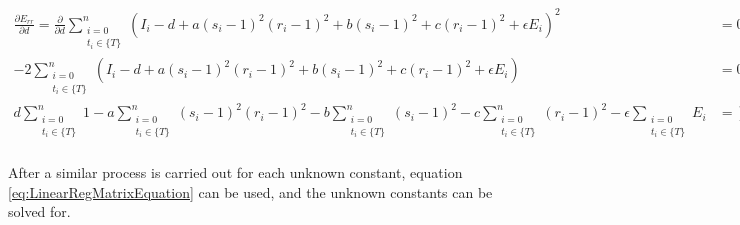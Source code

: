 \begin{equation*}
    \begin{split}
        \frac{\partial E_{rr}}{\partial d}=
        \frac{\partial}{\partial d}\sum_{
                \substack{i=0\\ t_i\in \{ T \}}
            }^n \left(
            I_i
            -d
            +a(s_i-1)^2(r_i-1)^2
            +b(s_i-1)^2
            +c(r_i-1)^2
            +\epsilon E_i
        \right)^2&=0\\
        -2\sum_{
                \substack{i=0\\ t_i\in \{ T \}}
            }^n \left(
            I_i
            -d
            +a(s_i-1)^2(r_i-1)^2
            +b(s_i-1)^2
            +c(r_i-1)^2
            +\epsilon E_i
        \right)&=0\\
        d \sum_{\substack{i=0\\ t_i\in \{ T \}}}^n 1 
        -a \sum_{\substack{i=0\\ t_i\in \{ T \}}}^n (s_i-1)^2(r_i-1)^2
        -b \sum_{\substack{i=0\\ t_i\in \{ T \}}}^n (s_i-1)^2
        -c \sum_{\substack{i=0\\ t_i\in \{ T \}}}^n (r_i-1)^2
        -\epsilon \sum_{\substack{i=0\\ t_i\in \{ T \}}} E_i
        &=
        \sum_{\substack{i=0\\ t_i\in \{ T \}}}^n I_i\\
    \end{split}
\end{equation*}

After a similar process is carried out for each unknown constant, equation \ref{eq:LinearRegMatrixEquation} can be used, and the unknown constants can be solved for.

